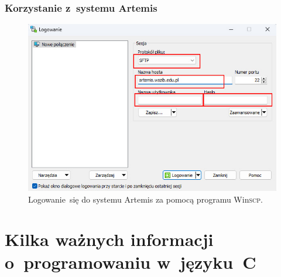 \documentclass[10pt,t]{beamer}
\begin{document}
\begin{frame}
  \frametitle{Korzystanie z~systemu Artemis}

  \vspace{-0.5em}


  \begin{figure}

    \centering


    \includegraphics[scale=0.45]
    {./Presentations-pictures/Artemis.jpg}


    \caption{Logowanie~się do systemu Artemis za pomocą programu
      Win\textsc{scp}.}


    \label{fig:Artemis-system}

  \end{figure}

\end{frame}










\section{Kilka ważnych informacji o~programowaniu
  w~języku~C}
\end{document}
